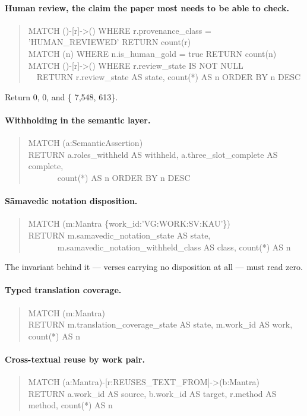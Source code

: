 \paragraph{Human review, the claim the paper most needs to be able to check.}
\begin{quote}\small\ttfamily
MATCH ()-[r]->() WHERE r.provenance\_class = 'HUMAN\_REVIEWED' RETURN count(r)\\
MATCH (n) WHERE n.is\_human\_gold = true RETURN count(n)\\
MATCH ()-[r]->() WHERE r.review\_state IS NOT NULL\\
\ \ RETURN r.review\_state AS state, count(*) AS n ORDER BY n DESC
\end{quote}
Return 0, 0, and \{ 7{,}548,  613\}.

\paragraph{Withholding in the semantic layer.}
\begin{quote}\small\ttfamily
MATCH (a:SemanticAssertion)\\
RETURN a.roles\_withheld AS withheld, a.three\_slot\_complete AS complete,\\
\ \ \ \ \ \ \ count(*) AS n ORDER BY n DESC
\end{quote}

\paragraph{S\=amavedic notation disposition.}
\begin{quote}\small\ttfamily
MATCH (m:Mantra \{work\_id:'VG:WORK:SV:KAU'\})\\
RETURN m.samavedic\_notation\_state AS state,\\
\ \ \ \ \ \ \ m.samavedic\_notation\_withheld\_class AS class, count(*) AS n
\end{quote}
The invariant behind it --- verses carrying no disposition at all --- must read zero.

\paragraph{Typed translation coverage.}
\begin{quote}\small\ttfamily
MATCH (m:Mantra)\\
RETURN m.translation\_coverage\_state AS state, m.work\_id AS work, count(*) AS n
\end{quote}

\paragraph{Cross-textual reuse by work pair.}
\begin{quote}\small\ttfamily
MATCH (a:Mantra)-[r:REUSES\_TEXT\_FROM]->(b:Mantra)\\
RETURN a.work\_id AS source, b.work\_id AS target, r.method AS method, count(*) AS n
\end{quote}
